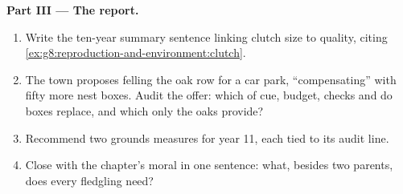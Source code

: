 \begin{problem}
\medskip\noindent\textbf{Part III --- The report.}
\begin{enumerate}[resume]
  \item Write the ten-year summary sentence linking
        clutch size to  quality, citing
        \cref{ex:g8:reproduction-and-environment:clutch}.
  \item The town proposes felling the oak row for a car
        park, ``compensating'' with fifty more nest
        boxes. Audit the offer: which of cue, budget,
        checks and  do boxes replace, and which
        only the oaks provide?
  \item Recommend two grounds measures for year 11, each
        tied to its audit line.
  \item Close with the chapter's moral in one sentence:
        what, besides two parents, does every fledgling
        need?
\end{enumerate}
\end{problem}
